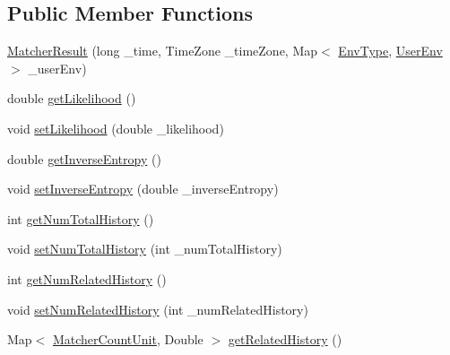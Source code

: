 \subsection*{\-Public \-Member \-Functions}
\begin{DoxyCompactItemize}
\item 
\hyperlink{classlab_1_1davidahn_1_1appshuttle_1_1predict_1_1matcher_1_1_matcher_result_ada5becac75131f1a27d8bd0e82893308}{\-Matcher\-Result} (long \-\_\-time, \-Time\-Zone \-\_\-time\-Zone, \-Map$<$ \hyperlink{enumlab_1_1davidahn_1_1appshuttle_1_1collect_1_1env_1_1_env_type}{\-Env\-Type}, \hyperlink{classlab_1_1davidahn_1_1appshuttle_1_1collect_1_1env_1_1_user_env}{\-User\-Env} $>$ \-\_\-user\-Env)
\item 
double \hyperlink{classlab_1_1davidahn_1_1appshuttle_1_1predict_1_1matcher_1_1_matcher_result_addb6b55620e0bb2186eae93a153ccc17}{get\-Likelihood} ()
\item 
void \hyperlink{classlab_1_1davidahn_1_1appshuttle_1_1predict_1_1matcher_1_1_matcher_result_a7094704b124754cf5db3033685b6c5df}{set\-Likelihood} (double \-\_\-likelihood)
\item 
double \hyperlink{classlab_1_1davidahn_1_1appshuttle_1_1predict_1_1matcher_1_1_matcher_result_a53bf05a4ad2454a4e099a654aa424028}{get\-Inverse\-Entropy} ()
\item 
void \hyperlink{classlab_1_1davidahn_1_1appshuttle_1_1predict_1_1matcher_1_1_matcher_result_ae3cf488987f20c769b733da55eab3f3f}{set\-Inverse\-Entropy} (double \-\_\-inverse\-Entropy)
\item 
int \hyperlink{classlab_1_1davidahn_1_1appshuttle_1_1predict_1_1matcher_1_1_matcher_result_a8bdc81a8929d01599596805fe0af4739}{get\-Num\-Total\-History} ()
\item 
void \hyperlink{classlab_1_1davidahn_1_1appshuttle_1_1predict_1_1matcher_1_1_matcher_result_af44bfa8d97d52752d5603c8e0f406b20}{set\-Num\-Total\-History} (int \-\_\-num\-Total\-History)
\item 
int \hyperlink{classlab_1_1davidahn_1_1appshuttle_1_1predict_1_1matcher_1_1_matcher_result_ab26bcec96fb688e6186243a044eb6b2c}{get\-Num\-Related\-History} ()
\item 
void \hyperlink{classlab_1_1davidahn_1_1appshuttle_1_1predict_1_1matcher_1_1_matcher_result_a138c20a983c5cc7aad6809179fcedf22}{set\-Num\-Related\-History} (int \-\_\-num\-Related\-History)
\item 
\-Map$<$ \hyperlink{classlab_1_1davidahn_1_1appshuttle_1_1predict_1_1matcher_1_1_matcher_count_unit}{\-Matcher\-Count\-Unit}, \-Double $>$ \hyperlink{classlab_1_1davidahn_1_1appshuttle_1_1predict_1_1matcher_1_1_matcher_result_ad66d324bce41c75624c1e3ed702b6738}{get\-Related\-History} ()

\end{DoxyCompactItemize}
